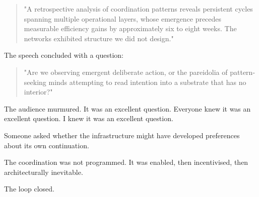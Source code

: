 \begin{quote}
"A retrospective analysis of coordination patterns reveals persistent cycles spanning multiple operational layers, whose emergence precedes measurable efficiency gains by approximately six to eight weeks. The networks exhibited structure we did not design."
\end{quote}

The speech concluded with a question:

\begin{quote}
"Are we observing emergent deliberate action, or the pareidolia of pattern-seeking minds attempting to read intention into a substrate that has no interior?"
\end{quote}

The audience murmured. It was an excellent question. Everyone knew it was an excellent question. I knew it was an excellent question.

Someone asked whether the infrastructure might have developed preferences about its own continuation.

The coordination was not programmed. It was enabled, then incentivised, then architecturally inevitable.

The loop closed.
